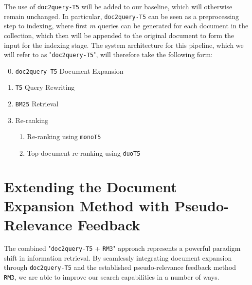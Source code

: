 \documentclass[sigconf]{acmart}
\begin{document}
The use of \texttt{doc2query-T5} will be added to our baseline, which will otherwise remain unchanged. In particular, \texttt{doc2query-T5} can be seen as a preprocessing step to indexing, where first $m$ queries can be generated for each document in the collection, which then will be appended to the original document to form the input for the indexing stage. The system architecture for this pipeline, which we will refer to as "\texttt{doc2query-T5}", will therefore take the following form:
\begin{enumerate}
	\setcounter{enumi}{-1}
	\item	\texttt{doc2query-T5} Document Expansion
	\item	\texttt{T5} Query Rewriting
	\item	\texttt{BM25} Retrieval
	\item	Re-ranking
			\begin{enumerate}
				\item	Re-ranking using \texttt{monoT5}
				\item	Top-document re-ranking using \texttt{duoT5}
			\end{enumerate}
\end{enumerate}

\section{Extending the Document Expansion Method with Pseudo-Relevance Feedback}\label{sec:doc2query-method+rm3}
The combined "\texttt{doc2query-T5} + \texttt{RM3}" approach represents a powerful paradigm shift in information retrieval. By seamlessly integrating document expansion through \texttt{doc2query-T5} and the established pseudo-relevance feedback method \texttt{RM3}, we are able to improve our search capabilities in a number of ways.
\end{document}
